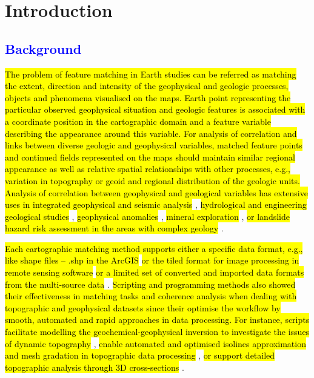 \documentclass[minerals,article,submit,pdftex,moreauthors]{Definitions/mdpi}
\begin{document}
\section{Introduction}

\subsection{\textcolor{blue}{Background}}

\hl{The problem of feature matching in Earth studies can be referred as matching the extent, direction and intensity of the geophysical and geologic processes, objects and phenomena visualised on the maps. Earth point representing the particular observed geophysical situation and geologic features is associated with a coordinate position in the cartographic domain and a feature variable describing the appearance around this variable. For analysis of correlation and links between diverse geologic and geophysical variables, matched feature points and continued fields represented on the maps should maintain  similar regional appearance as well as relative spatial relationships with other processes, e.g., variation in topography or geoid and regional distribution of the geologic units. Analysis of correlation between geophysical and geological variables has extensive uses in integrated geophysical and seismic analysis} \cite{NDAMNJIKAM2023104816}, \hl{hydrological and engineering geological studies} \cite{AMPONSAH2022104558}, \hl{geophysical anomalies }\cite{MATENDE2023104766}, \hl{mineral exploration} \cite{STEUER2020104172}, \hl{or landslide hazard risk assessment in the areas with complex geology} \cite{CALAMITA2023106984,DIMAIO2020105473}.

\hl{Each cartographic matching method supports either a specific data format, e.g., like shape files -- .shp in the ArcGIS} \cite{LAR2023e01436,NGENE2022360,CHENG2022106052} \hl{or the tiled format for image processing in remote sensing software} \cite{KONWEA2023e01597,ALKHERSAN2022104678} \hl{or a limited set of converted and imported data formats from the multi-source data} \cite{SAHA2022104706,APEH2022104561,SHEBL2022765}. \hl{Scripting and programming methods also showed their effectiveness in matching tasks and coherence analysis when dealing with topographic and geophysical datasets since their optimise the workflow by smooth, automated and rapid approaches in data processing. For instance, scripts facilitate modelling the geochemical-geophysical inversion to investigate the issues of dynamic topography} \cite{Jones}, \hl{enable automated and optimised isolines approximation and mesh gradation in topographic data processing} \cite{GORMAN20081721}, \hl{or support detailed topographic analysis through 3D cross-sections} \cite{Sobh,Lemenkova202301}.
\end{document}
